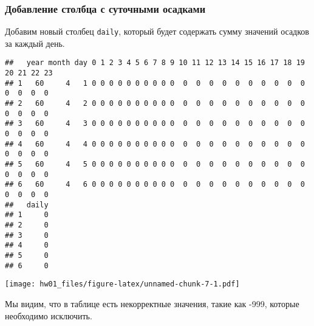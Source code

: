 \documentclass[
]{article}
\newenvironment{Shaded}{\begin{snugshade}}{\end{snugshade}}
\newcommand{\AttributeTok}[1]{\textcolor[rgb]{0.13,0.29,0.53}{#1}}
\newcommand{\DecValTok}[1]{\textcolor[rgb]{0.00,0.00,0.81}{#1}}
\newcommand{\FunctionTok}[1]{\textcolor[rgb]{0.13,0.29,0.53}{\textbf{#1}}}
\newcommand{\NormalTok}[1]{#1}
\newcommand{\OtherTok}[1]{\textcolor[rgb]{0.56,0.35,0.01}{#1}}
\newcommand{\SpecialCharTok}[1]{\textcolor[rgb]{0.81,0.36,0.00}{\textbf{#1}}}
\newcommand{\StringTok}[1]{\textcolor[rgb]{0.31,0.60,0.02}{#1}}
\begin{document}
\subsubsection{Добавление столбца с суточными
осадками}\label{ux434ux43eux431ux430ux432ux43bux435ux43dux438ux435-ux441ux442ux43eux43bux431ux446ux430-ux441-ux441ux443ux442ux43eux447ux43dux44bux43cux438-ux43eux441ux430ux434ux43aux430ux43cux438}

Добавим новый столбец \texttt{daily}, который будет содержать сумму
значений осадков за каждый день.

\begin{Shaded}
\end{Shaded}

\begin{verbatim}
##   year month day 0 1 2 3 4 5 6 7 8 9 10 11 12 13 14 15 16 17 18 19 20 21 22 23
## 1   60     4   1 0 0 0 0 0 0 0 0 0 0  0  0  0  0  0  0  0  0  0  0  0  0  0  0
## 2   60     4   2 0 0 0 0 0 0 0 0 0 0  0  0  0  0  0  0  0  0  0  0  0  0  0  0
## 3   60     4   3 0 0 0 0 0 0 0 0 0 0  0  0  0  0  0  0  0  0  0  0  0  0  0  0
## 4   60     4   4 0 0 0 0 0 0 0 0 0 0  0  0  0  0  0  0  0  0  0  0  0  0  0  0
## 5   60     4   5 0 0 0 0 0 0 0 0 0 0  0  0  0  0  0  0  0  0  0  0  0  0  0  0
## 6   60     4   6 0 0 0 0 0 0 0 0 0 0  0  0  0  0  0  0  0  0  0  0  0  0  0  0
##   daily
## 1     0
## 2     0
## 3     0
## 4     0
## 5     0
## 6     0
\end{verbatim}

\begin{Shaded}
\end{Shaded}

\texttt{[image: hw01\_files/figure-latex/unnamed-chunk-7-1.pdf]}

Мы видим, что в таблице есть некорректные значения, такие как -999,
которые необходимо исключить.
\end{document}
